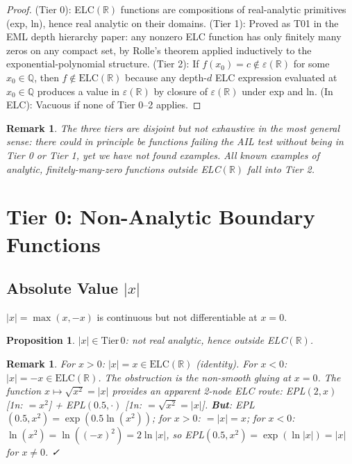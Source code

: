 \documentclass[11pt]{article}
\newtheorem{proposition}[theorem]{Proposition}
\newtheorem{remark}[theorem]{Remark}
\begin{document}
\begin{proof}
(Tier 0): ELC$(\mathbb{R})$ functions are compositions of real-analytic primitives
(exp, ln), hence real analytic on their domains.
(Tier 1): Proved as T01 in the EML depth hierarchy paper: any nonzero ELC function
has only finitely many zeros on any compact set, by Rolle's theorem applied inductively
to the exponential-polynomial structure.
(Tier 2): If $f(x_0)=c\notin\varepsilon(\mathbb{R})$ for some $x_0\in\mathbb{Q}$,
then $f\notin\mathrm{ELC}(\mathbb{R})$ because any depth-$d$ ELC expression evaluated
at $x_0\in\mathbb{Q}$ produces a value in $\varepsilon(\mathbb{R})$ by closure
of $\varepsilon(\mathbb{R})$ under exp and ln.
(In ELC): Vacuous if none of Tier 0--2 applies.
\end{proof}

\begin{remark}
The three tiers are \emph{disjoint} but not exhaustive in the most general sense:
there could in principle be functions failing the AIL test without being in Tier 0 or Tier 1,
yet we have not found examples. All known examples of analytic, finitely-many-zero functions
outside ELC$(\mathbb{R})$ fall into Tier 2.
\end{remark}

\section{Tier 0: Non-Analytic Boundary Functions}

\subsection{Absolute Value $|x|$}

$|x|=\max(x,-x)$ is continuous but not differentiable at $x=0$.

\begin{proposition}
$|x|\in\mathrm{Tier\,0}$: not real analytic, hence outside ELC$(\mathbb{R})$.
\end{proposition}

\begin{remark}
For $x>0$: $|x|=x\in\mathrm{ELC}(\mathbb{R})$ (identity). For $x<0$: $|x|=-x\in\mathrm{ELC}(\mathbb{R})$.
The obstruction is the non-smooth gluing at $x=0$.
The function $x\mapsto\sqrt{x^2}=|x|$ provides an apparent 2-node ELC route:
EPL$(2,x)$ [1n: $=x^2$] + EPL$(0.5,\cdot)$ [1n: $=\sqrt{x^2}=|x|$].
\textbf{But}: EPL$(0.5,x^2)=\exp(0.5\ln(x^2))$; for $x>0$: $=|x|=x$; for $x<0$:
$\ln(x^2)=\ln((-x)^2)=2\ln|x|$, so EPL$(0.5,x^2)=\exp(\ln|x|)=|x|$ for $x\neq0$. ✓
\end{remark}
\end{document}
